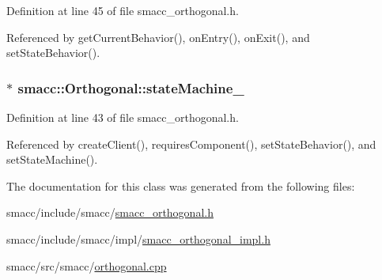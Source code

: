 Definition at line 45 of file smacc\+\_\+orthogonal.\+h.



Referenced by get\+Current\+Behavior(), on\+Entry(), on\+Exit(), and set\+State\+Behavior().

\subsubsection[{\texorpdfstring{state\+Machine\+\_\+}{stateMachine_}}]{$\ast$ smacc\+::\+Orthogonal\+::state\+Machine\+\_\+\hspace{0.3cm}{\ttfamily [private]}}\hypertarget{classsmacc_1_1Orthogonal_acea2058ac94667e46fc60ed3d4f524f7}{}\label{classsmacc_1_1Orthogonal_acea2058ac94667e46fc60ed3d4f524f7}


Definition at line 43 of file smacc\+\_\+orthogonal.\+h.



Referenced by create\+Client(), requires\+Component(), set\+State\+Behavior(), and set\+State\+Machine().



The documentation for this class was generated from the following files\+:\begin{DoxyCompactItemize}
\item 
smacc/include/smacc/\hyperlink{smacc__orthogonal_8h}{smacc\+\_\+orthogonal.\+h}\item 
smacc/include/smacc/impl/\hyperlink{smacc__orthogonal__impl_8h}{smacc\+\_\+orthogonal\+\_\+impl.\+h}\item 
smacc/src/smacc/\hyperlink{orthogonal_8cpp}{orthogonal.\+cpp}\end{DoxyCompactItemize}
